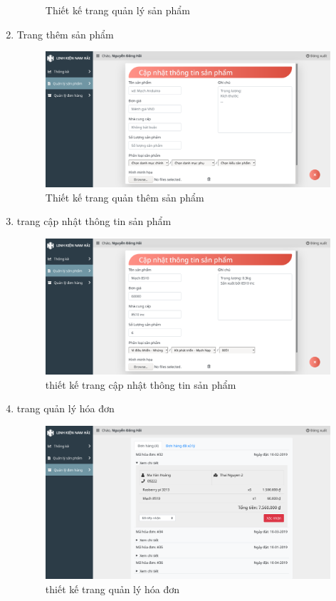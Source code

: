 \begin{enumerate}[label=\textbf{\alph*)}]
\begin{figure}[h!]
		      \caption{Thiết kế trang quản lý sản phẩm}
	      \end{figure}
          \newpage
	\item Trang thêm sản phẩm
	      \begin{figure}[h!]
		      \includegraphics[width=\linewidth]{fig/r_manage_product_add_product.png}
		      \caption{Thiết kế trang quản thêm sản phẩm}
	      \end{figure}
	\item trang cập nhật thông tin sản phẩm
	      \begin{figure}[h!]
		      \includegraphics[width=\linewidth]{fig/r_manage_product_update_product.png}
		      \caption{thiết kế trang cập nhật thông tin sản phẩm}
	      \end{figure}
          \newpage
	\item trang quản lý hóa đơn
	      \begin{figure}[h!]
		      \includegraphics[width=\linewidth]{fig/r_order.png}
		      \caption{thiết kế trang quản lý hóa đơn}
	      \end{figure}
          \newpage
\end{enumerate}
